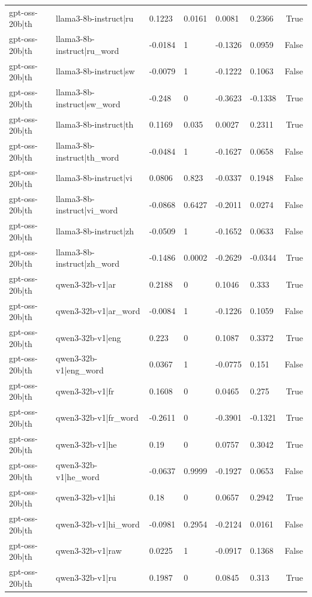 \begin{table}
\begin{tabular}{llllllr}
gpt-oss-20b|th & llama3-8b-instruct|ru & 0.1223 & 0.0161 & 0.0081 & 0.2366 & True \\
gpt-oss-20b|th & llama3-8b-instruct|ru_word & -0.0184 & 1 & -0.1326 & 0.0959 & False \\
gpt-oss-20b|th & llama3-8b-instruct|sw & -0.0079 & 1 & -0.1222 & 0.1063 & False \\
gpt-oss-20b|th & llama3-8b-instruct|sw_word & -0.248 & 0 & -0.3623 & -0.1338 & True \\
gpt-oss-20b|th & llama3-8b-instruct|th & 0.1169 & 0.035 & 0.0027 & 0.2311 & True \\
gpt-oss-20b|th & llama3-8b-instruct|th_word & -0.0484 & 1 & -0.1627 & 0.0658 & False \\
gpt-oss-20b|th & llama3-8b-instruct|vi & 0.0806 & 0.823 & -0.0337 & 0.1948 & False \\
gpt-oss-20b|th & llama3-8b-instruct|vi_word & -0.0868 & 0.6427 & -0.2011 & 0.0274 & False \\
gpt-oss-20b|th & llama3-8b-instruct|zh & -0.0509 & 1 & -0.1652 & 0.0633 & False \\
gpt-oss-20b|th & llama3-8b-instruct|zh_word & -0.1486 & 0.0002 & -0.2629 & -0.0344 & True \\
gpt-oss-20b|th & qwen3-32b-v1|ar & 0.2188 & 0 & 0.1046 & 0.333 & True \\
gpt-oss-20b|th & qwen3-32b-v1|ar_word & -0.0084 & 1 & -0.1226 & 0.1059 & False \\
gpt-oss-20b|th & qwen3-32b-v1|eng & 0.223 & 0 & 0.1087 & 0.3372 & True \\
gpt-oss-20b|th & qwen3-32b-v1|eng_word & 0.0367 & 1 & -0.0775 & 0.151 & False \\
gpt-oss-20b|th & qwen3-32b-v1|fr & 0.1608 & 0 & 0.0465 & 0.275 & True \\
gpt-oss-20b|th & qwen3-32b-v1|fr_word & -0.2611 & 0 & -0.3901 & -0.1321 & True \\
gpt-oss-20b|th & qwen3-32b-v1|he & 0.19 & 0 & 0.0757 & 0.3042 & True \\
gpt-oss-20b|th & qwen3-32b-v1|he_word & -0.0637 & 0.9999 & -0.1927 & 0.0653 & False \\
gpt-oss-20b|th & qwen3-32b-v1|hi & 0.18 & 0 & 0.0657 & 0.2942 & True \\
gpt-oss-20b|th & qwen3-32b-v1|hi_word & -0.0981 & 0.2954 & -0.2124 & 0.0161 & False \\
gpt-oss-20b|th & qwen3-32b-v1|raw & 0.0225 & 1 & -0.0917 & 0.1368 & False \\
gpt-oss-20b|th & qwen3-32b-v1|ru & 0.1987 & 0 & 0.0845 & 0.313 & True \\

\end{tabular}
\end{table}
